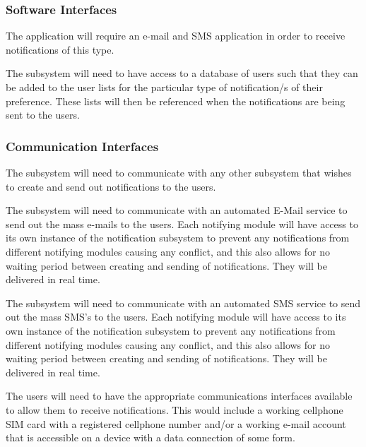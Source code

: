 \documentclass{article}
\begin{document}
	\subsubsection{Software Interfaces}
	\begin{flushleft}
	The application will require an e-mail and SMS application in order to receive notifications of this type.
\newline

	The subsystem will need to have access to a database of users such that they can be added to the user lists for the particular type of notification/s of their preference. These lists will then be referenced when the notifications are being sent to the users.
\end{flushleft}	    

	\subsubsection{Communication Interfaces}
	\begin{flushleft}
	The subsystem will need to communicate with any other subsystem that wishes to create and send out notifications to the users.
\newline

	The subsystem will need to communicate with an automated E-Mail service to send out the mass e-mails to the users. Each notifying module will have access to its own instance of the notification subsystem to prevent any notifications from different notifying modules causing any conflict, and this also allows for no waiting period between creating and sending of notifications. They will be delivered in real time.
\newline

	The subsystem will need to communicate with an automated SMS service to send out the mass SMS's to the users. Each notifying module will have access to its own instance of the notification subsystem to prevent any notifications from different notifying modules causing any conflict, and this also allows for no waiting period between creating and sending of notifications. They will be delivered in real time.
\newline

	The users will need to have the appropriate communications interfaces available to allow them to receive notifications. This would include a working cellphone SIM card with a registered cellphone number and/or a working e-mail account that is accessible on a device with a data connection of some form.
	\end{flushleft}
	
\end{document}
